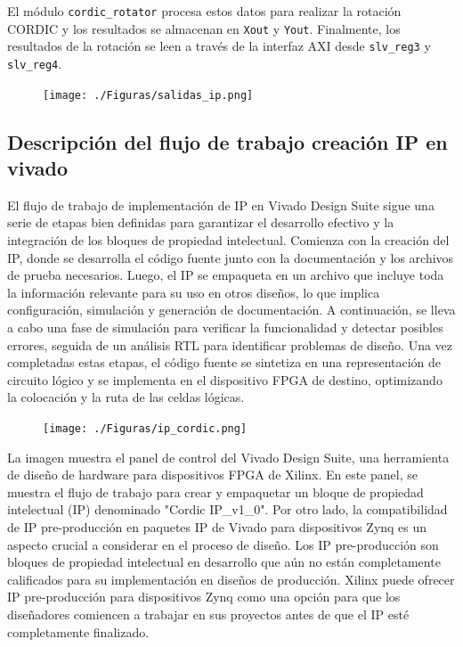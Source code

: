 \documentclass[12pt,a4paper, twoside]{article} %
\begin{document}
El módulo \texttt{cordic\_rotator} procesa estos datos para realizar la rotación CORDIC y los resultados se almacenan en \texttt{Xout} y \texttt{Yout}. Finalmente, los resultados de la rotación se leen a través de la interfaz AXI desde \texttt{slv\_reg3} y \texttt{slv\_reg4}.

\begin{figure}[ht]
\centering
\texttt{[image: ./Figuras/salidas\_ip.png]}
\label{fig:Diagrama de conexión del módulo minimizado}
\end{figure}




\subsection{Descripción del flujo de trabajo creación IP en vivado}

El flujo de trabajo de implementación de IP en Vivado Design Suite sigue una serie de etapas bien definidas para garantizar el desarrollo efectivo y la integración de los bloques de propiedad intelectual. Comienza con la creación del IP, donde se desarrolla el código fuente junto con la documentación y los archivos de prueba necesarios. Luego, el IP se empaqueta en un archivo que incluye toda la información relevante para su uso en otros diseños, lo que implica configuración, simulación y generación de documentación. A continuación, se lleva a cabo una fase de simulación para verificar la funcionalidad y detectar posibles errores, seguida de un análisis RTL para identificar problemas de diseño. Una vez completadas estas etapas, el código fuente se sintetiza en una representación de circuito lógico y se implementa en el dispositivo FPGA de destino, optimizando la colocación y la ruta de las celdas lógicas.


\begin{figure}[ht]
\centering
\texttt{[image: ./Figuras/ip\_cordic.png]}
\label{fig:Flujo de trabajo creación IP}
\end{figure}

La imagen muestra el panel de control del Vivado Design Suite, una herramienta de diseño de hardware para dispositivos FPGA de Xilinx. En este panel, se muestra el flujo de trabajo para crear y empaquetar un bloque de propiedad intelectual (IP) denominado "Cordic IP\_v1\_0". Por otro lado, la compatibilidad de IP pre-producción en paquetes IP de Vivado para dispositivos Zynq es un aspecto crucial a considerar en el proceso de diseño. Los IP pre-producción son bloques de propiedad intelectual en desarrollo que aún no están completamente calificados para su implementación en diseños de producción. Xilinx puede ofrecer IP pre-producción para dispositivos Zynq como una opción para que los diseñadores comiencen a trabajar en sus proyectos antes de que el IP esté completamente finalizado. 
\end{document}
